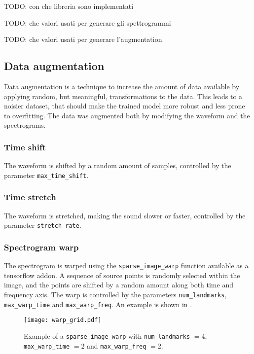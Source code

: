 TODO: con che libreria sono implementati

TODO: che valori usati per generare gli spettrogrammi

TODO: che valori usati per generare l'augmentation

\subsection{Data augmentation}

Data augmentation is a technique to increase the amount of data available by
applying random, but meaningful, transformations to the data. This leads to a
noisier dataset, that should make the trained model more robust and less prone
to overfitting. The data was augmented both by modifying the waveform and the
spectrograms.

\subsubsection{Time shift}

The waveform is shifted by a random amount of samples, controlled by the
parameter \texttt{max_time_shift}.

\subsubsection{Time stretch}

The waveform is stretched, making the sound slower or faster, controlled by the
parameter \texttt{stretch_rate}.

\subsubsection{Spectrogram warp}

The spectrogram is warped using the \texttt{sparse_image_warp} function
available as a tensorflow addon.
A sequence of source points is randomly selected within the image, and the
points are shifted by a random amount along both time and frequency axis. The
warp is controlled by the parameters \texttt{num_landmarks},
\texttt{max_warp_time} and \texttt{max_warp_freq}.
An example is shown in .

\begin{figure}[t!]
    \centering
    \texttt{[image: warp\_grid.pdf]}
    \caption{Example of a \texttt{sparse_image_warp} with \texttt{num_landmarks} $=4$, \texttt{max_warp_time} $=2$ and \texttt{max_warp_freq} $=2$.}%
    \label{fig:warp_grid}
\end{figure}

